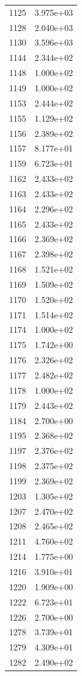 \documentclass[12pt]{article}
\begin{document}
\begin{longtable}{@{}cc@{}}
1125 & 3.975e+03 \\
1128 & 2.040e+03 \\
1130 & 3.596e+03 \\
1144 & 2.344e+02 \\
1148 & 1.000e+02 \\
1149 & 1.000e+02 \\
1153 & 2.444e+02 \\
1155 & 1.129e+02 \\
1156 & 2.389e+02 \\
1157 & 8.177e+01 \\
1159 & 6.723e+01 \\
1162 & 2.433e+02 \\
1163 & 2.433e+02 \\
1164 & 2.296e+02 \\
1165 & 2.433e+02 \\
1166 & 2.369e+02 \\
1167 & 2.398e+02 \\
1168 & 1.521e+02 \\
1169 & 1.509e+02 \\
1170 & 1.520e+02 \\
1171 & 1.514e+02 \\
1174 & 1.000e+02 \\
1175 & 1.742e+00 \\
1176 & 2.326e+02 \\
1177 & 2.482e+02 \\
1178 & 1.000e+02 \\
1179 & 2.443e+02 \\
1184 & 2.700e+00 \\
1195 & 2.368e+02 \\
1197 & 2.376e+02 \\
1198 & 2.375e+02 \\
1199 & 2.369e+02 \\
1203 & 1.305e+02 \\
1207 & 2.470e+02 \\
1208 & 2.465e+02 \\
1211 & 4.760e+02 \\
1214 & 1.775e+00 \\
1216 & 3.910e+01 \\
1220 & 1.909e+00 \\
1222 & 6.723e+01 \\
1226 & 2.700e+00 \\
1278 & 3.739e+01 \\
1279 & 4.309e+01 \\
1282 & 2.490e+02 \\

\end{longtable}
\end{document}
